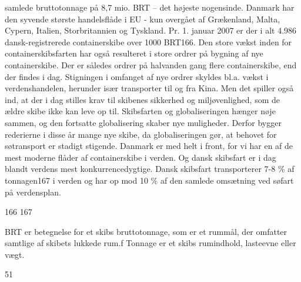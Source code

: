 samlede bruttotonnage på 8,7 mio. BRT -- det højeste nogensinde. Danmark
har den syvende største handelsflåde i EU - kun overgået af Grækenland,
Malta, Cypern, Italien, Storbritannien og Tyskland. Pr. 1. januar 2007
er der i alt 4.986 dansk-registrerede containerskibe over 1000 BRT166.
Den store vækst inden for containerskibsfarten har også resulteret i
store ordrer på bygning af nye containerskibe. Der er således ordrer på
halvanden gang flere containerskibe, end der findes i dag. Stigningen i
omfanget af nye ordrer skyldes bl.a. vækst i verdenshandelen, herunder
især transporter til og fra Kina. Men det spiller også ind, at der i dag
stilles krav til skibenes sikkerhed og miljøvenlighed, som de ældre
skibe ikke kan leve op til. Skibsfarten og globaliseringen hænger nøje
sammen, og den fortsatte globalisering skaber nye muligheder. Derfor
bygger rederierne i disse år mange nye skibe, da globaliseringen gør, at
behovet for søtransport er stadigt stigende. Danmark er med helt i
front, for vi har en af de mest moderne flåder af containerskibe i
verden. Og dansk skibsfart er i dag blandt verdens mest
konkurrencedygtige. Dansk skibsfart transporterer 7-8 \% af tonnagen167
i verden og har op mod 10 \% af den samlede omsætning ved søfart på
verdensplan.

166 167

BRT er betegnelse for et skibs bruttotonnage, som er et rummål, der
omfatter samtlige af skibets lukkede rum.f Tonnage er et skibs
rumindhold, lasteevne eller vægt.

51
